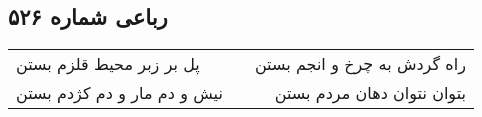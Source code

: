 \begin{center}
\section*{رباعی شماره ۵۲۶}
\label{sec:sh526}
\begin{longtable}{l p{0.5cm} r}
پل بر زبر محیط قلزم بستن
&&
راه گردش به چرخ و انجم بستن
\\
نیش و دم مار و دم کژدم بستن
&&
بتوان نتوان دهان مردم بستن
\\
\end{longtable}
\end{center}
